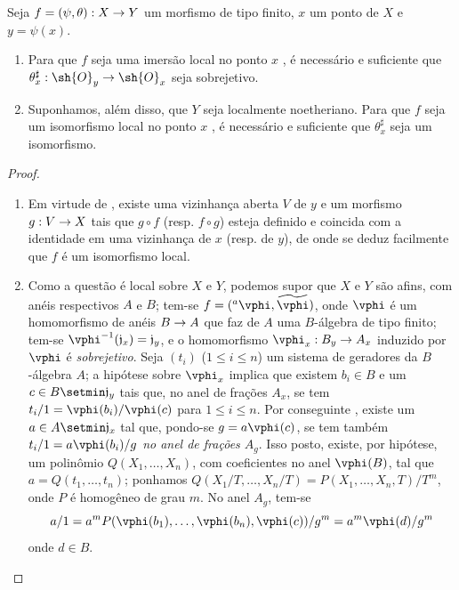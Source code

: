 \documentclass[oneside]{amsart}
\makeatletter
\renewcommand{\leq}{\leqslant}
\newcommand{\ega@arrow}[2]{\mathchoice{#1}{#2}{#2}{#2}}
\renewcommand{\to}{\ega@arrow{\longrightarrow}{\rightarrow}}
\newcommand{\oldpage}[2][]{{\marginnote{\normalfont\textbf{#1}~|~#2}}\ignorespaces}
\let\EGAOriginalLabel\label
\renewcommand{\label}[1]{\phantomsection\EGAOriginalLabel{#1}}
\makeatother
\begin{document}
\begin{proposition}[6.5.4]
\label{I.6.5.4}
Seja $f=(\psi,\theta):X\to Y$ um morfismo de tipo finito, $x$ um ponto de $X$ e $y=\psi(x)$.
\begin{enumerate}
  \item[{\rm(i)}] Para que $f$ seja uma imersão local no ponto $x$ , é necessário e suficiente que $\theta_x^\sharp:\sh{O}_y\to\sh{O}_x$ seja sobrejetivo.
  \item[{\rm(ii)}] Suponhamos, além disso, que $Y$ seja localmente noetheriano.
    Para que $f$ seja um isomorfismo local no ponto $x$ , é necessário e suficiente que $\theta_x^\sharp$ seja um isomorfismo.
\end{enumerate}
\end{proposition}

\begin{proof}
\medskip\noindent
\begin{enumerate}
  \item[(ii)] Em virtude de , existe uma vizinhança aberta $V$ de $y$ e um morfismo $g:V\to X$ tais que $g\circ f$ (resp. $f\circ g$) esteja definido e coincida com a identidade em uma vizinhança de $x$ (resp. de $y$), de onde se deduz facilmente que $f$ é um isomorfismo local.
  \item[(i)] Como a questão é local sobre $X$ e $Y$, podemos supor que $X$ e $Y$ são afins, com anéis respectivos $A$ e $B$;
    tem-se $f=({}^a\vphi,\widetilde{\vphi})$, onde $\vphi$ é um homomorfismo de anéis $B\to A$ que faz de $A$ uma $B$-álgebra de tipo finito;
    tem-se $\vphi^{-1}(\mathfrak{j}_x)=\mathfrak{j}_y$, e o homomorfismo $\vphi_x:B_y\to A_x$ induzido por $\vphi$ é \emph{sobrejetivo}.
    Seja $(t_i)$ ($1\leq i\leq n$) um sistema de geradores da $B$-álgebra $A$;
    a hipótese sobre $\vphi_x$ implica que existem $b_i\in B$ e um $c\in B\setmin\mathfrak{j}_y$ tais que, no anel de frações $A_x$, se tem $t_i/1=\vphi(b_i)/\vphi(c)$ para $1\leq i\leq n$.
    Por conseguinte , existe um $a\in A\setmin\mathfrak{j}_x$ tal que, pondo-se $g=a\vphi(c)$, se tem também $t_i/1=a\vphi(b_i)/g$ \emph{no anel de frações $A_g$}.
    Isso posto, existe, por hipótese, um polinômio $Q(X_1,\ldots,X_n)$, com coeficientes no anel $\vphi(B)$,
\oldpage[I]{152}
    tal que $a=Q(t_1,\ldots,t_n)$;
    ponhamos $Q(X_1/T,\ldots,X_n/T)=P(X_1,\ldots,X_n,T)/T^m$, onde $P$ é homogêneo de grau $m$.
    No anel $A_g$, tem-se
    \[
      a/1=a^mP(\vphi(b_1),\ldots,\vphi(b_n),\vphi(c))/g^m=a^m\vphi(d)/g^m
    \]
    onde $d\in B$.

\end{enumerate}
\end{proof}
\end{document}
